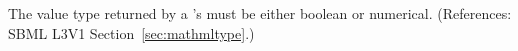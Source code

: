 The value type returned by a \FunctionDefinition's  must be
either boolean or numerical.  (References: SBML L3V1 Section~\ref{sec:mathmltype}.)
